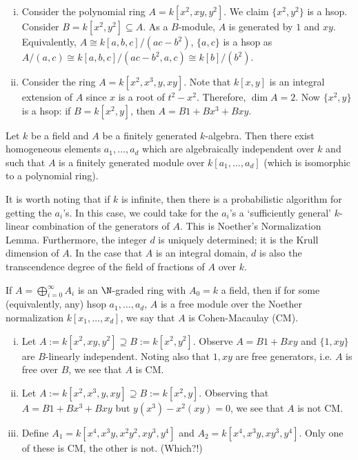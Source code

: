 \begin{ex} \hfill
\begin{enumerate}[(i)]
\item Consider the polynomial ring $A= k[x^2,xy,y^2]$. We claim $\{x^2,y^2\}$ is a hsop. Consider $B= k[x^2,y^2] \subseteq A$. As a $B$-module, $A$ is generated by $1$ and $xy$. Equivalently, $A \cong k[a,b,c]/(ac-b^2)$, $\{a,c\}$ is a hsop as $A/(a,c) \cong k[a,b,c]/(ac-b^2,a,c) \cong k[b]/(b^2)$. 

\item Consider the ring $A= k[x^2,x^3,y,xy]$. Note that $k[x,y]$ is an integral extension of $A$ since $x$ is a root of $t^2-x^2$. Therefore, $\dim A=2$. Now $\{x^2,y \}$ is a hsop: if $B= k[x^2,y]$, then $A= B1 + Bx^3+Bxy$. 
\end{enumerate}
\end{ex}


\begin{thm}[Noether]
Let $k$ be a field and $A$ be a finitely generated $k$-algebra. Then there exist homogeneous elements $a_1,\ldots,a_d$ which are algebraically independent over $k$ and such that $A$ is a finitely generated module over $k[a_1,\ldots,a_d]$ (which is isomorphic to a polynomial ring). 
\end{thm}

It is worth noting that if $k$ is infinite, then there is a probabilistic algorithm for getting the $a_i$'s. In this case, we could take for the $a_i$'s a `sufficiently general' $k$-linear combination of the generators of $A$. This is Noether's Normalization Lemma. Furthermore, the integer $d$ is uniquely determined; it is the Krull dimension of $A$. In the case that $A$ is an integral domain, $d$ is also the transcendence degree of the field of fractions of $A$ over $k$. 


\begin{dfn}
If $A= \bigoplus_{i=0}^\infty A_i$ is an $\N$-graded ring with $A_0=k$ a field, then if for some (equivalently, any) hsop $a_1,\ldots,a_d$, $A$ is a free module over the Noether normalization $k[x_1,\ldots,x_d]$, we say that $A$ is Cohen-Macaulay (CM). 
\end{dfn}


\begin{ex} \hfill
\begin{enumerate}[(i)]
\item Let $A:= k[x^2,xy,y^2] \supseteq B:= k[x^2,y^2]$. Observe $A= B1+Bxy$ and $\{1, xy\}$ are $B$-linearly independent. Noting also that $1, xy$ are free generators, i.e. $A$ is free over $B$, we see that $A$ is CM.

\item Let $A:= k[x^2,x^3,y,xy] \supseteq B:= k[x^2,y]$. Observing that $A= B1 + Bx^3+Bxy$ but $y(x^3)-x^2(xy)=0$, we see that $A$ is not CM. 

\item Define $A_1= k[x^4,x^3y,x^2y^2,xy^3,y^4]$ and $A_2= k[x^4,x^3y,xy^3,y^4]$. Only one of these is CM, the other is not. (Which?!)
\end{enumerate}
\end{ex}


